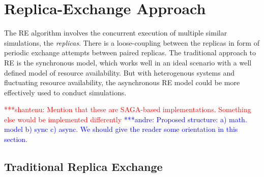 \documentclass{rspublic}
\newcommand{\jhanote}[1]{ {\textcolor{red} { ***shantenu: #1 }}}
\newcommand{\alnote}[1]{ {\textcolor{blue} { ***andre: #1 }}}
\newcommand{\alnote}[1]{}
\newcommand{\jhanote}[1]{}
\begin{document}
\section{Replica-Exchange Approach}
\label{sec:repex-approach}
The RE algorithm involves the concurrent execution of multiple similar
simulations, the \emph{replicas}.  There is a loose-coupling between
the replicas in form of periodic exchange attempts between paired
replicas. The traditional approach to RE is the synchronous model,
which works well in an ideal scenario with a well defined model of
resource availability. But with heterogenous systems and fluctuating
resource availability, the asynchronous RE model could be more
effectively used to conduct simulations.





\jhanote{Mention that these are SAGA-based implementations. Something
  else would be implemented differently}
\alnote{Proposed structure: a) math. model b) sync c) async. We should give the reader some orientation in this section.}

\subsection{Traditional Replica Exchange}
\end{document}
